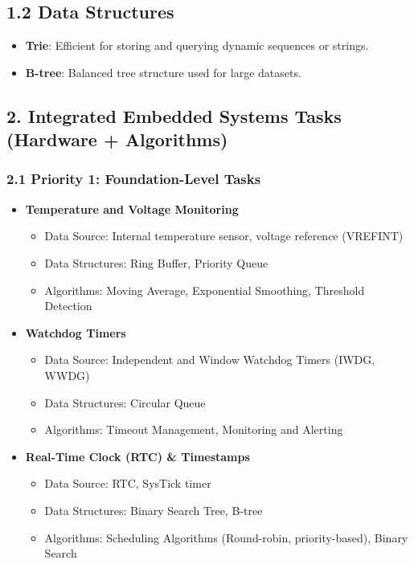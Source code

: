 \documentclass{article}
\begin{document}
\subsection*{1.2 Data Structures}
\begin{itemize}
    \item \textbf{Trie}: Efficient for storing and querying dynamic sequences or strings.
    \item \textbf{B-tree}: Balanced tree structure used for large datasets.
\end{itemize}

\subsection*{2. Integrated Embedded Systems Tasks (Hardware + Algorithms)}
\subsubsection*{2.1 Priority 1: Foundation-Level Tasks}
\begin{itemize}
    \item \textbf{Temperature and Voltage Monitoring}
    \begin{itemize}
        \item Data Source: Internal temperature sensor, voltage reference (VREFINT)
        \item Data Structures: Ring Buffer, Priority Queue
        \item Algorithms: Moving Average, Exponential Smoothing, Threshold Detection
    \end{itemize}
    
    \item \textbf{Watchdog Timers}
    \begin{itemize}
        \item Data Source: Independent and Window Watchdog Timers (IWDG, WWDG)
        \item Data Structures: Circular Queue
        \item Algorithms: Timeout Management, Monitoring and Alerting
    \end{itemize}
    
    \item \textbf{Real-Time Clock (RTC) \& Timestamps}
    \begin{itemize}
        \item Data Source: RTC, SysTick timer
        \item Data Structures: Binary Search Tree, B-tree
        \item Algorithms: Scheduling Algorithms (Round-robin, priority-based), Binary Search
    \end{itemize}
\end{itemize}
\end{document}
